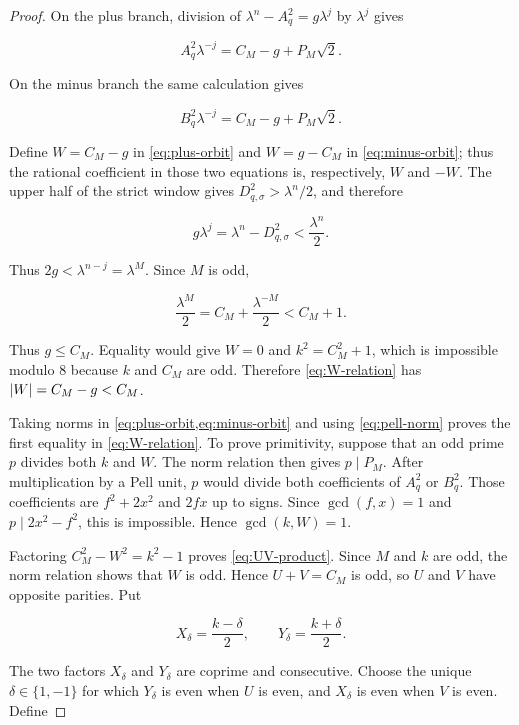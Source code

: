 \begin{proof}
On the plus branch, division of
$\lambda^n-A_q^2=g\lambda^j$ by $\lambda^j$ gives

\begin{equation}
 A_q^2\lambda^{-j}=C_M-g+P_M\sqrt2.
 \label{eq:plus-orbit}
\end{equation}

On the minus branch the same calculation gives

\begin{equation}
 B_q^2\lambda^{-j}=C_M-g+P_M\sqrt2.
 \label{eq:minus-orbit}
\end{equation}

Define $W=C_M-g$ in \cref{eq:plus-orbit} and $W=g-C_M$ in
\cref{eq:minus-orbit}; thus the rational coefficient in those two equations
is, respectively, $W$ and $-W$. The upper half of the strict window gives
$D_{q,\sigma}^2>\lambda^n/2$, and therefore

\[
 g\lambda^j=\lambda^n-D_{q,\sigma}^2<\frac{\lambda^n}{2}.
\]

Thus $2g<\lambda^{n-j}=\lambda^M$. Since $M$ is odd,

\begin{equation}
 \frac{\lambda^M}{2}=C_M+\frac{\lambda^{-M}}2<C_M+1.
\end{equation}

Thus $g\leqslant C_M$. Equality would give $W=0$ and
$k^2=C_M^2+1$, which is impossible modulo $8$ because $k$ and $C_M$ are
odd. Therefore \cref{eq:W-relation} has $\lvert W\rvert=C_M-g<C_M$.

Taking norms in \cref{eq:plus-orbit,eq:minus-orbit} and using
\cref{eq:pell-norm} proves the first equality in \cref{eq:W-relation}. To
prove primitivity, suppose that an odd prime $p$ divides both $k$ and $W$.
The norm relation then gives $p\mid P_M$. After multiplication by a Pell
unit, $p$ would divide both coefficients of $A_q^2$ or $B_q^2$. Those
coefficients are $f^2+2x^2$ and $2fx$ up to signs. Since
$\gcd(f,x)=1$ and $p\mid2x^2-f^2$, this is impossible. Hence
$\gcd(k,W)=1$.

Factoring $C_M^2-W^2=k^2-1$ proves
\cref{eq:UV-product}. Since $M$ and $k$ are odd, the norm relation shows
that $W$ is odd. Hence $U+V=C_M$ is odd, so $U$ and $V$ have opposite
parities. Put

\begin{equation}
 X_\delta=\frac{k-\delta}{2},
 \qquad
 Y_\delta=\frac{k+\delta}{2}.
\end{equation}

The two factors $X_\delta$ and $Y_\delta$ are coprime and consecutive.
Choose the unique $\delta\in\{1,-1\}$ for which $Y_\delta$ is even when
$U$ is even, and $X_\delta$ is even when $V$ is even. Define


\end{proof}
